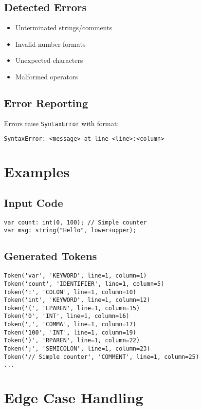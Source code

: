 \documentclass{article}
\begin{document}
\subsection{Detected Errors}
\begin{itemize}
    \item Unterminated strings/comments
    \item Invalid number formats
    \item Unexpected characters
    \item Malformed operators
\end{itemize}

\subsection{Error Reporting}
Errors raise \texttt{SyntaxError} with format:
\begin{verbatim}
SyntaxError: <message> at line <line>:<column>
\end{verbatim}

\section{Examples}
\subsection{Input Code}
\begin{lstlisting}
var count: int(0, 100); // Simple counter
var msg: string("Hello", lower+upper);
\end{lstlisting}

\subsection{Generated Tokens}
\begin{lstlisting}
Token('var', 'KEYWORD', line=1, column=1)
Token('count', 'IDENTIFIER', line=1, column=5)
Token(':', 'COLON', line=1, column=10)
Token('int', 'KEYWORD', line=1, column=12)
Token('(', 'LPAREN', line=1, column=15)
Token('0', 'INT', line=1, column=16)
Token(',', 'COMMA', line=1, column=17)
Token('100', 'INT', line=1, column=19)
Token(')', 'RPAREN', line=1, column=22)
Token(';', 'SEMICOLON', line=1, column=23)
Token('// Simple counter', 'COMMENT', line=1, column=25)
...
\end{lstlisting}

\section{Edge Case Handling}
\end{document}
